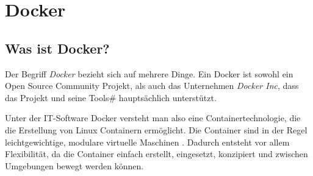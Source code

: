 \section{Docker}
\subsection{Was ist Docker?}
Der Begriff \textit{Docker} bezieht sich auf mehrere Dinge. Ein Docker ist sowohl ein Open Source
Community Projekt, als auch das Unternehmen \textit{Docker Inc}, dass das Projekt und seine Tools#
hauptsächlich unterstützt.

Unter der IT-Software Docker versteht man also eine Containertechnologie, die die Erstellung von Linux
Containern ermöglicht. Die Container sind in der Regel leichtgewichtige, modulare virtuelle Maschinen
. Dadurch entsteht vor allem Flexibilität, da die Container einfach erstellt, eingesetzt, konzipiert
und zwischen Umgebungen bewegt werden können.

\label{Docker}